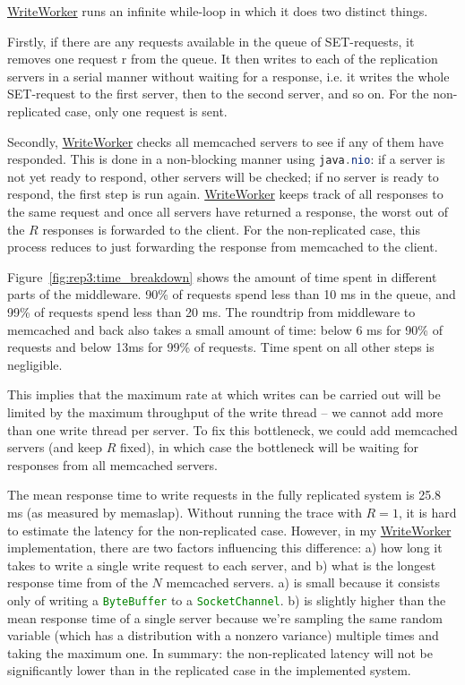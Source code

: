 \documentclass[11pt]{article}
\newcommand{\code}[1]{\lstinline[language=Java]{#1}}
\newcommand{\linkmain}[1]{\href{https://gitlab.inf.ethz.ch/pungast/asl-fall16-project/blob/master/src/main/java/asl/#1.java}{#1}}
\begin{document}
\linkmain{WriteWorker} runs an infinite while-loop in which it does two distinct things.

Firstly, if there are any requests available in the queue of SET-requests, it removes one request r from the queue. It then writes to each of the replication servers in a serial manner without waiting for a response, i.e. it writes the whole SET-request to the first server, then to the second server, and so on. For the non-replicated case, only one request is sent.

Secondly, \linkmain{WriteWorker} checks all memcached servers to see if any of them have responded. This is done in a non-blocking manner using \code{java.nio}: if a server is not yet ready to respond, other servers will be checked; if no server is ready to respond, the first step is run again. \linkmain{WriteWorker} keeps track of all responses to the same request and once all servers have returned a response, the worst out of the $R$ responses is forwarded to the client. For the non-replicated case, this process reduces to just forwarding the response from memcached to the client.

Figure~\ref{fig:rep3:time_breakdown} shows the amount of time spent in different parts of the middleware. 90\% of requests spend less than 10 ms in the queue, and 99\% of requests spend less than 20 ms. The roundtrip from middleware to memcached and back also takes a small amount of time: below 6 ms for 90\% of requests and below 13ms for 99\% of requests. Time spent on all other steps is negligible.

This implies that the maximum rate at which writes can be carried out will be limited by the maximum throughput of the write thread -- we cannot add more than one write thread per server. To fix this bottleneck, we could add memcached servers (and keep $R$ fixed), in which case the bottleneck will be waiting for responses from all memcached servers.

The mean response time to write requests in the fully replicated system is 25.8 ms (as measured by memaslap). Without running the trace with $R=1$, it is hard to estimate the latency for the non-replicated case. However, in my \linkmain{WriteWorker} implementation, there are two factors influencing this difference: a) how long it takes to write a single write request to each server, and b) what is the longest response time from of the $N$ memcached servers. a) is small because it consists only of writing a \code{ByteBuffer} to a \code{SocketChannel}. b) is slightly higher than the mean response time of a single server because we're sampling the same random variable (which has a distribution with a nonzero variance) multiple times and taking the maximum one. In summary: the non-replicated latency will not be significantly lower than in the replicated case in the implemented system.
\end{document}
